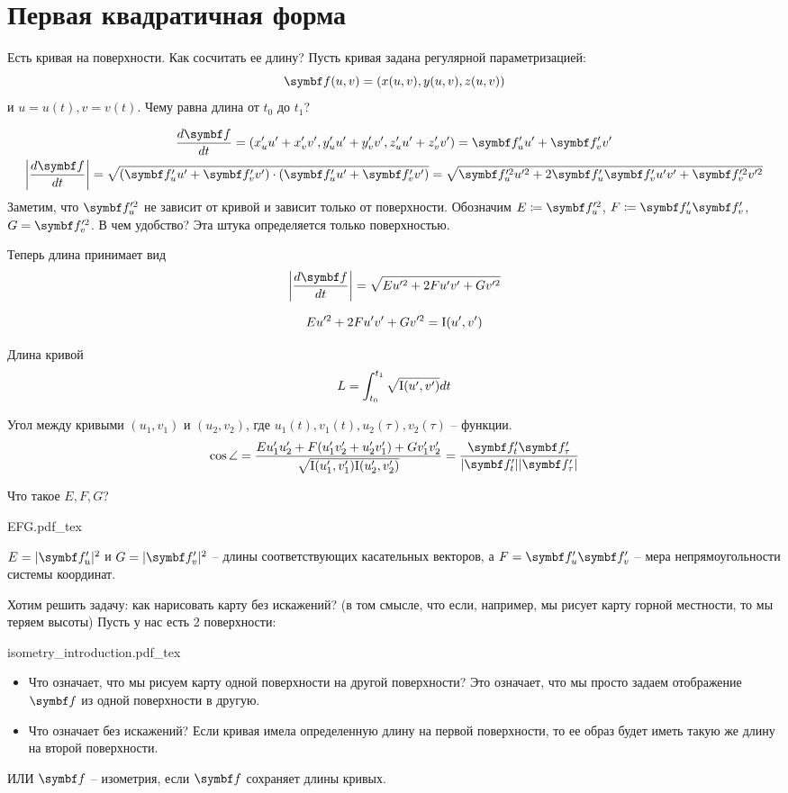 \documentclass[main]{subfiles}
\begin{document}
\chapter{Первая квадратичная форма}
Есть кривая на поверхности. Как сосчитать ее длину?
Пусть кривая задана регулярной параметризацией:
\[\vf(u,v) = (x(u,v), y(u,v), z(u,v))\]
и $u = u(t), v = v(t)$.
Чему равна длина от $t_0$ до $t_1$?

\begin{gather*}
    \frac{d\vf}{dt} = (x_u' u' + x_v' v', y_u' u' + y_v' v', z_u' u' + z_v' v') = \vf_u' u' + \vf_v' v'\\
    \left| \frac{d\vf}{dt} \right| = \sqrt{(\vf_u' u' + \vf_v' v') \cdot (\vf_u' u' + \vf_v' v')} = \sqrt{\vf_u'^2 u'^2 + 2 \vf_u'\vf_v' u'v' + \vf_v'^2 v'^2}
\end{gather*}
Заметим, что $\vf_u'^2$ не зависит от кривой и зависит только от поверхности.
Обозначим $E \coloneqq \vf_u'^2$, $F \coloneqq \vf_u' \vf_v'$, $G = \vf_v'^2$.
В чем удобство? Эта штука определяется только поверхностью.

Теперь длина принимает вид
\[\left| \frac{d\vf}{dt} \right| = \sqrt{E u'^2 + 2Fu'v' + Gv'^2}\]
\begin{definition}
    \[Eu'^2 + 2F u'v' + G v'^2 = \mathrm{I}(u',v')\]
\end{definition}
\begin{theorem}
    Длина кривой
    \[L = \int_{t_0}^{t_1} \sqrt{\mathrm{I}(u', v')} dt\]
\end{theorem}
\begin{theorem}
    Угол между кривыми $(u_1, v_1)$ и $(u_2, v_2)$, где
    $u_1(t), v_1(t), u_2(\tau), v_2(\tau)$ -- функции.
    \[\cos\angle = \frac{Eu_1' u_2' + F(u_1' v_2' + u_2' v_1') + G v_1' v_2'}{\sqrt{\fff(u_1', v_1')\fff(u_2', v_2')}} = \frac{\vf_t' \vf_\tau '}{|\vf_t'| |\vf_\tau'|}\]
\end{theorem}

Что такое $E, F, G$?
\begin{center}
    {EFG.pdf_tex}
\end{center}
$E = |\vf_u'|^2$ и $G = |\vf_v'|^2$ -- длины соответствующих касательных векторов, а
$F = \vf_u' \vf_v'$ -- мера непрямоугольности системы координат.

Хотим решить задачу: как нарисовать карту без искажений? 
(в том смысле, что если, например, мы рисует карту горной местности, то мы теряем высоты)
Пусть у нас есть 2 поверхности:
\begin{center}
    {isometry_introduction.pdf_tex}
\end{center}
\begin{itemize}
    \item Что означает, что мы рисуем карту одной поверхности на другой поверхности?
          Это означает, что мы просто задаем отображение $\vf$ из одной поверхности в другую.
    \item Что означает без искажений?
          Если кривая имела определенную длину на первой поверхности, то ее образ будет иметь такую же длину на второй поверхности.
\end{itemize}
ИЛИ $\vf$ -- изометрия, если $\vf$ сохраняет длины кривых.
\end{document}
